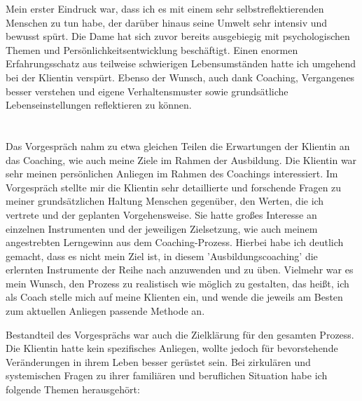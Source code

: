 \documentclass[11pt,a4paper]{article}
\begin{document}
Mein erster Eindruck war, dass ich es mit einem sehr selbstreflektierenden Menschen zu tun habe, der darüber hinaus seine Umwelt sehr intensiv und bewusst spürt. Die Dame hat sich zuvor bereits ausgebiegig mit psychologischen Themen und Persönlichkeitsentwicklung beschäftigt. Einen enormen Erfahrungsschatz aus teilweise schwierigen Lebensumständen hatte ich umgehend bei der Klientin verspürt. Ebenso der Wunsch, auch dank Coaching, Vergangenes besser verstehen und eigene Verhaltensmuster sowie grundsätliche Lebenseinstellungen reflektieren zu können.



\section*{\color{MidnightBlue}{Coaching-Sitzungen}}



\subsection*{\color{Orange}{Vorgespräch}}

Das Vorgespräch nahm zu etwa gleichen Teilen die Erwartungen der Klientin an das Coaching, wie auch meine Ziele im Rahmen der Ausbildung. Die Klientin war sehr meinen persönlichen Anliegen im Rahmen des Coachings interessiert. Im Vorgespräch stellte mir die Klientin sehr detaillierte und forschende Fragen zu meiner grundsätzlichen Haltung Menschen gegenüber, den Werten, die ich vertrete und der geplanten Vorgehensweise. Sie hatte großes Interesse an einzelnen Instrumenten und der jeweiligen Zielsetzung, wie auch meinem angestrebten Lerngewinn aus dem Coaching-Prozess. Hierbei habe ich deutlich gemacht, dass es nicht mein Ziel ist, in diesem 'Ausbildungscoaching' die erlernten Instrumente der Reihe nach anzuwenden und zu üben. Vielmehr war es mein Wunsch, den Prozess zu realistisch wie möglich zu gestalten, das heißt, ich als Coach stelle mich auf meine Klienten ein, und wende die jeweils am Besten zum aktuellen Anliegen passende Methode an.

Bestandteil des Vorgesprächs war auch die Zielklärung für den gesamten Prozess. Die Klientin hatte kein spezifisches Anliegen, wollte jedoch für bevorstehende Veränderungen in ihrem Leben besser gerüstet sein. Bei zirkulären und systemischen Fragen zu ihrer familiären und beruflichen Situation habe ich folgende Themen herausgehört:
\end{document}
